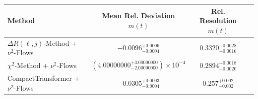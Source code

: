     \begin{tabular}{lccc}
        \toprule
        Method & Mean Rel. Deviation $m(t)$ & Rel. Resolution $m(t)$ \\
        \midrule
        $\Delta R(\ell,j)$-Method + $\nu^2$-Flows & $-0.0096^{+0.0006}_{-0.0004}$ & $0.3320^{+0.0028}_{-0.0016}$ \\
        $\chi^2$-Method + $\nu^2$-Flows & $(4.00000000^{+3.00000000}_{-2.00000000})\times 10^{-4}$ & $0.2894^{+0.0018}_{-0.0020}$ \\
        CompactTransformer + $\nu^2$-Flows & $-0.0305^{+0.0003}_{-0.0004}$ & $0.257^{+0.002}_{-0.002}$ \\
        \bottomrule
    \end{tabular}